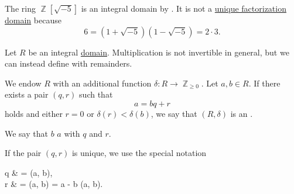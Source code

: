 \begin{example}\label{ex:integral_domain_not_ufd}
  The ring \( \BbbZ[\sqrt{-5}] \) is an integral domain by . It is not a \hyperref[def:unique_factorization_domain]{unique factorization domain} because
  \begin{equation*}
    6 = (1 + \sqrt{-5}) (1 - \sqrt{-5}) = 2 \cdot 3.
  \end{equation*}
\end{example}

\begin{definition}\label{def:euclidean_domain}
  Let \( R \) be an integral \hyperref[def:integral_domain]{domain}. Multiplication is not invertible in general, but we can instead define  with remainders.

  We endow \( R \) with an additional function \( \delta: R \to \BbbZ_{\geq 0} \). Let \( a, b \in R \). If there exists a pair \( (q, r) \) such that
  \begin{equation*}
    a = bq + r
  \end{equation*}
  holds and either \( r = 0 \) or \( \delta(r) < \delta(b) \), we say that \( (R, \delta) \) is an .

  We say that \( b \)  \( a \) with  \( q \) and  \( r \).

  If the pair \( (q, r) \) is unique, we use the special notation
  \begin{balign*}
    q & = \quot(a, b),                    \\
    r & = \rem(a, b) = a - b \quot(a, b).
  \end{balign*}
\end{definition}

